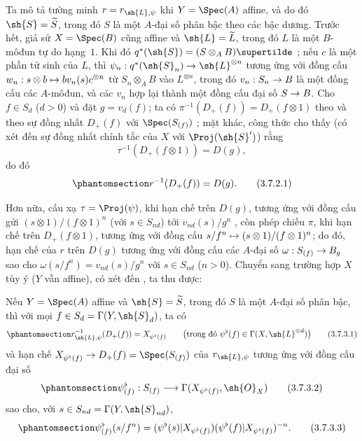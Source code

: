 \documentclass[oneside,10pt]{amsart}
\makeatletter
\newcommand{\ega@arrow}[2]{\mathchoice{#1}{#2}{#2}{#2}}
\let\ega@shortmapsto\mapsto
\renewcommand{\to}{\ega@arrow{\longrightarrow}{\rightarrow}}
\renewcommand{\mapsto}{\ega@arrow{\longmapsto}{\ega@shortmapsto}}
\let\EGAOriginalLabel\label
\renewcommand{\label}[1]{\phantomsection\EGAOriginalLabel{#1}}
\makeatother
\begin{document}
\begin{env}[3.7.2]
\label{II.3.7.2}
Ta mô tả tường minh $r=r_{\sh{L},\psi}$ khi $Y=\Spec(A)$ affine, và do đó $\sh{S}=\widetilde{S}$, trong đó $S$ là một $A$-đại số phân bậc theo các bậc dương.
Trước hết, giả sử $X=\Spec(B)$ cũng affine và $\sh{L}=\widetilde{L}$, trong đó $L$ là một $B$-môđun tự do hạng~$1$.
Khi đó $q^*(\sh{S})=(S\otimes_A B)\supertilde$ ;
nếu $c$ là một phần tử sinh của $L$, thì $\psi_n:q^*(\sh{S}_n)\to\sh{L}^{\otimes n}$ tương ứng với đồng cấu $w_n:s\otimes b\mapsto bv_n(s)c^{\otimes n}$ từ $S_n\otimes_A B$ vào $L^{\otimes n}$, trong đó $v_n:S_n\to B$ là một đồng cấu các $A$-môđun, và các $v_n$ hợp lại thành một đồng cấu đại số $S\to B$.
Cho $f\in S_d$ ($d>0$) và đặt $g=v_d(f)$;
ta có $\pi^{-1}(D_+(f))=D_+(f\otimes1)$ theo  và theo sự đồng nhất $D_+(f)$ với $\Spec(S_{(f)})$ ;
mặt khác, công thức  cho thấy (có xét đến sự đồng nhất chính tắc của $X$ với $\Proj(\sh{S}')$) rằng
\[
  \tau^{-1}(D_+(f\otimes1))=D(g),
\]
do đó
\[
\label{II.3.7.2.1}
  r^{-1}(D_+(f))=D(g).
\tag{3.7.2.1}
\]

Hơn nữa, cấu xạ $\tau=\Proj(\psi)$, khi hạn chế trên $D(g)$, tương ứng với đồng cấu gửi $(s\otimes1)/(f\otimes1)^n$ (với $s\in S_{nd}$) tới $v_{nd}(s)/g^n$ , còn phép chiếu $\pi$, khi hạn chế trên $D_+(f\otimes1)$, tương ứng với đồng cấu $s/f^n\mapsto(s\otimes1)/(f\otimes1)^n$;
do đó, hạn chế của $r$ trên $D(g)$ tương ứng với đồng cấu các $A$-đại số $\omega:S_{(f)}\to B_g$ sao cho $\omega(s/f^n)=v_{nd}(s)/g^n$ với $s\in S_{nd}$ ($n>0$).
Chuyển sang trường hợp $X$ tùy ý ($Y$ vẫn affine), có xét đến , ta thu được:
\end{env}

\begin{proposition}[3.7.3]
\label{II.3.7.3}
Nếu $Y=\Spec(A)$ affine và $\sh{S}=\widetilde{S}$, trong đó $S$ là một $A$-đại số phân bậc, thì với mọi $f\in S_d=\Gamma(Y,\sh{S}_d)$, ta có
\[
\label{II.3.7.3.1}
  r_{\sh{L},\psi}^{-1}(D_+(f))=X_{\psi^\flat(f)}
  \qquad\bigl(\text{trong đó }\psi^\flat(f)\in\Gamma(X,\sh{L}^{\otimes d})\bigr)
\tag{3.7.3.1}
\]
và hạn chế $X_{\psi^\flat(f)}\to D_+(f)=\Spec(S_{(f)})$ của $r_{\sh{L},\psi}$ tương ứng  với đồng cấu đại số
\[
\label{II.3.7.3.2}
  \psi_{(f)}^\flat:S_{(f)}\longrightarrow
  \Gamma(X_{\psi^\flat(f)},\sh{O}_X)
\tag{3.7.3.2}
\]
sao cho, với $s\in S_{nd}=\Gamma(Y,\sh{S}_{nd})$,
\[
\label{II.3.7.3.3}
  \psi_{(f)}^\flat(s/f^n)
  =(\psi^\flat(s)|X_{\psi^\flat(f)})
   (\psi^\flat(f)|X_{\psi^\flat(f)})^{-n}.
\tag{3.7.3.3}
\]
\end{proposition}
\end{document}
